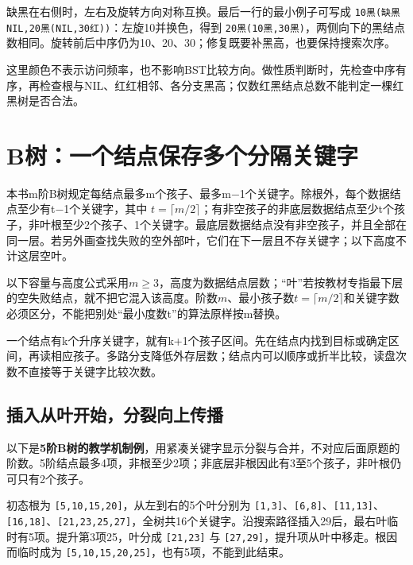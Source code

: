 缺黑在右侧时，左右及旋转方向对称互换。最后一行的最小例子可写成 \texttt{10黑(\allowbreak{}缺黑NIL,\allowbreak{}20黑(\allowbreak{}NIL,\allowbreak{}30红)\allowbreak{})\allowbreak{}}：左旋10并换色，得到 \texttt{20黑(\allowbreak{}10黑,\allowbreak{}30黑)\allowbreak{}}，两侧向下的黑结点数相同。旋转前后中序仍为10、20、30；修复既要补黑高，也要保持搜索次序。

这里颜色不表示访问频率，也不影响BST比较方向。做性质判断时，先检查中序有序，再检查根与NIL、红红相邻、各分支黑高；仅数红黑结点总数不能判定一棵红黑树是否合法。

\section{B树：一个结点保存多个分隔关键字}\label{DS07-07}

本书m阶B树规定每结点最多m个孩子、最多m\ensuremath{-}1个关键字。除根外，每个数据结点至少有t\ensuremath{-}1个关键字，其中 \(t=\lceil m/2\rceil\)；有非空孩子的非底层数据结点至少t个孩子，非叶根至少2个孩子、1个关键字。最底层数据结点没有非空孩子，并且全部在同一层。若另外画查找失败的空外部叶，它们在下一层且不存关键字；以下高度不计这层空叶。

以下容量与高度公式采用\(m\ge3\)，高度为数据结点层数；``叶''若按教材专指最下层的空失败结点，就不把它混入该高度。阶数\(m\)、最小孩子数\(t=\lceil m/2\rceil\)和关键字数必须区分，不能把别处``最小度数t''的算法原样按m替换。

一个结点有k个升序关键字，就有k+1个孩子区间。先在结点内找到目标或确定区间，再读相应孩子。多路分支降低外存层数；结点内可以顺序或折半比较，读盘次数不直接等于关键字比较次数。

\subsection{插入从叶开始，分裂向上传播}\label{ux63d2ux5165ux4eceux53f6ux5f00ux59cbux5206ux88c2ux5411ux4e0aux4f20ux64ad}

以下是\textbf{5阶B树的教学机制例}，用紧凑关键字显示分裂与合并，不对应后面原题的阶数。5阶结点最多4项，非根至少2项；非底层非根因此有3至5个孩子，非叶根仍可只有2个孩子。

初态根为 \texttt{[5,\allowbreak{}10,\allowbreak{}15,\allowbreak{}20]}，从左到右的5个叶分别为 \texttt{[1,\allowbreak{}3]}、\texttt{[6,\allowbreak{}8]}、\texttt{[11,\allowbreak{}13]}、\texttt{[16,\allowbreak{}18]}、\texttt{[21,\allowbreak{}23,\allowbreak{}25,\allowbreak{}27]}，全树共16个关键字。沿搜索路径插入29后，最右叶临时有5项。提升第3项25，叶分成 \texttt{[21,\allowbreak{}23]} 与 \texttt{[27,\allowbreak{}29]}，提升项从叶中移走。根因而临时成为 \texttt{[5,\allowbreak{}10,\allowbreak{}15,\allowbreak{}20,\allowbreak{}25]}，也有5项，不能到此结束。

